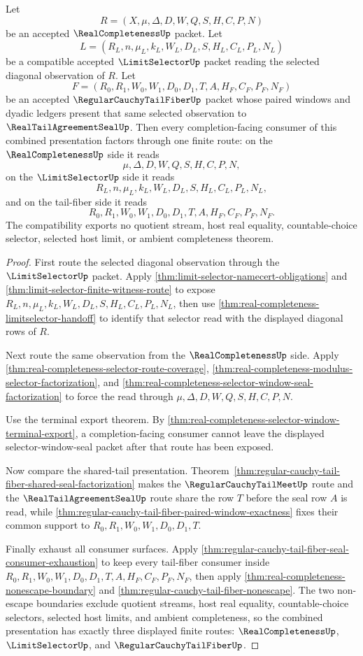 \begin{theorem}
\label{thm:real-completeness-tail-fiber-selector-compatibility}
Let
$$
R=(X,\mu,\Delta,D,W,Q,S,H,C,P,N)
$$
be an accepted $\RealCompletenessUp$ packet. Let
$$
L=(R_L,n,\mu_L,k_L,W_L,D_L,S,H_L,C_L,P_L,N_L)
$$
be a compatible accepted $\LimitSelectorUp$ packet reading the selected diagonal observation of $R$. Let
$$
F=(R_0,R_1,W_0,W_1,D_0,D_1,T,A,H_F,C_F,P_F,N_F)
$$
be an accepted $\RegularCauchyTailFiberUp$ packet whose paired windows and dyadic ledgers present that same selected observation to $\RealTailAgreementSealUp$. Then every completion-facing consumer of this combined presentation factors through one finite route: on the $\RealCompletenessUp$ side it reads
$$
\mu,\Delta,D,W,Q,S,H,C,P,N,
$$
on the $\LimitSelectorUp$ side it reads
$$
R_L,n,\mu_L,k_L,W_L,D_L,S,H_L,C_L,P_L,N_L,
$$
and on the tail-fiber side it reads
$$
R_0,R_1,W_0,W_1,D_0,D_1,T,A,H_F,C_F,P_F,N_F.
$$
The compatibility exports no quotient stream, host real equality, countable-choice selector, selected host limit, or ambient completeness theorem.
\end{theorem}
\begin{proof}
First route the selected diagonal observation through the $\LimitSelectorUp$ packet. Apply \autoref{thm:limit-selector-namecert-obligations} and \autoref{thm:limit-selector-finite-witness-route} to expose $R_L,n,\mu_L,k_L,W_L,D_L,S,H_L,C_L,P_L,N_L$, then use \autoref{thm:real-completeness-limitselector-handoff} to identify that selector read with the displayed diagonal rows of $R$.

Next route the same observation from the $\RealCompletenessUp$ side. Apply \autoref{thm:real-completeness-selector-route-coverage}, \autoref{thm:real-completeness-modulus-selector-factorization}, and \autoref{thm:real-completeness-selector-window-seal-factorization} to force the read through $\mu,\Delta,D,W,Q,S,H,C,P,N$.

Use the terminal export theorem. By \autoref{thm:real-completeness-selector-window-terminal-export}, a completion-facing consumer cannot leave the displayed selector-window-seal packet after that route has been exposed.

Now compare the shared-tail presentation. Theorem~\ref{thm:regular-cauchy-tail-fiber-shared-seal-factorization} makes the $\RegularCauchyTailMeetUp$ route and the $\RealTailAgreementSealUp$ route share the row $T$ before the seal row $A$ is read, while \autoref{thm:regular-cauchy-tail-fiber-paired-window-exactness} fixes their common support to $R_0,R_1,W_0,W_1,D_0,D_1,T$.

Finally exhaust all consumer surfaces. Apply \autoref{thm:regular-cauchy-tail-fiber-seal-consumer-exhaustion} to keep every tail-fiber consumer inside $R_0,R_1,W_0,W_1,D_0,D_1,T,A,H_F,C_F,P_F,N_F$, then apply \autoref{thm:real-completeness-nonescape-boundary} and \autoref{thm:regular-cauchy-tail-fiber-nonescape}. The two non-escape boundaries exclude quotient streams, host real equality, countable-choice selectors, selected host limits, and ambient completeness, so the combined presentation has exactly three displayed finite routes: $\RealCompletenessUp$, $\LimitSelectorUp$, and $\RegularCauchyTailFiberUp$.
\end{proof}
